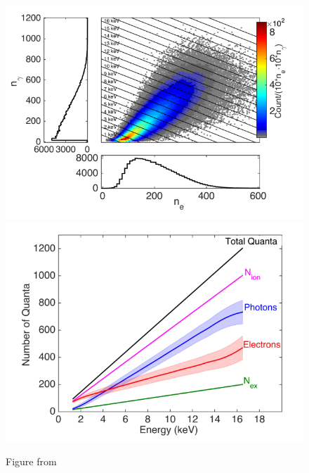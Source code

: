 \begin{figure}[htbp]
\begin{center}
\includegraphics[width=\halffig]{figures/lux/lux_tritium3a.png}
\includegraphics[width=\halffig]{figures/lux/lux_tritium3b.png}
\caption{ Figure from \cite{LUXTritium}}
\label{fig:tritium1}
\end{center}
\end{figure}


